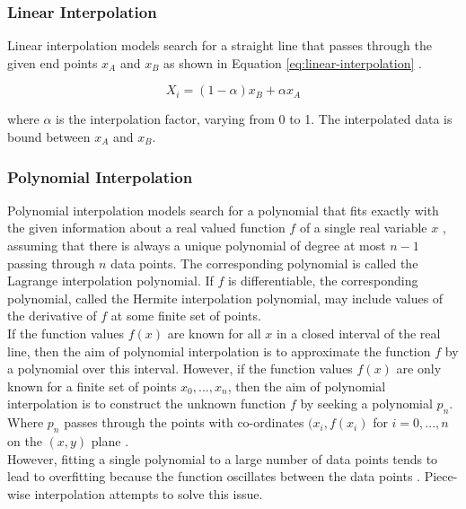 \subsubsection{Linear Interpolation}

Linear interpolation models search for a straight line that passes through the given end points $x_A$ and $x_B$ as shown in Equation \ref{eq:linear-interpolation} \cite{interpolation-in-time-series}.

\begin{equation}
    \label{eq:linear-interpolation}
    X_i = (1-\alpha)x_B + \alpha x_A
\end{equation}

where $\alpha$ is the interpolation factor, varying from 0 to 1. The interpolated data is bound between $x_A$ and $x_B$.

\subsubsection{Polynomial Interpolation}

Polynomial interpolation models search for a polynomial that fits exactly with the given information about a real valued function $f$ of a single real variable $x$ \cite{intro-to-numerical-analysis-suli}, assuming that there is always a unique polynomial of degree at most $n-1$ passing through $n$ data points. The corresponding polynomial is called the Lagrange interpolation polynomial. If $f$ is differentiable, the corresponding polynomial, called the Hermite interpolation polynomial, may include values of the derivative of $f$ at some finite set of points. \\

If the function values $f(x)$ are known for all $x$ in a closed interval of the real line, then the aim of polynomial interpolation is to approximate the function $f$ by a polynomial over this interval. However, if the function values $f(x)$ are only known for a finite set of points $x_0, ..., x_n$, then the aim of polynomial interpolation is to construct the unknown function $f$ by seeking a polynomial $p_n$. Where $p_n$ passes through the points with co-ordinates $(x_i, f(x_i)$ for $i = 0, ..., n$ on the $(x, y)$ plane \cite{intro-to-numerical-analysis-suli}. \\

However, fitting a single polynomial to a large number of data points tends to lead to overfitting because the function oscillates between the data points \cite{intro-to-numerical-analysis-atkinson}. Piece-wise interpolation attempts to solve this issue. 

